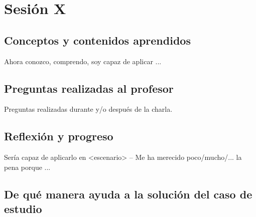 \chapter{Sesión X}\label{cap:sesionX}

\section{Conceptos y contenidos aprendidos}
Ahora conozco, comprendo, soy capaz de aplicar ...

\section{Preguntas realizadas al profesor}
Preguntas realizadas durante y/o después de la charla.

\section{Reflexión y progreso}
Sería capaz de aplicarlo en <escenario> -- Me ha merecido poco/mucho/... la pena porque ...

\section{De qué manera ayuda a la solución del caso de estudio}

